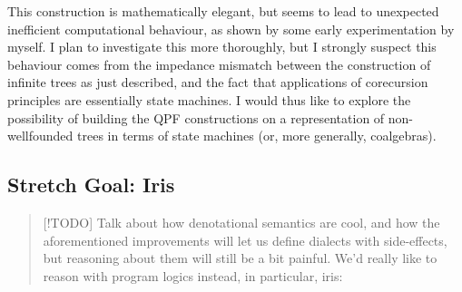 \documentclass[a4paper]{scrartcl}
\begin{document}
This construction is mathematically elegant, but seems to lead to
unexpected inefficient computational behaviour, as shown by some early
experimentation by myself. I plan to investigate this more thoroughly,
but I strongly suspect this behaviour comes from the impedance mismatch
between the construction of infinite trees as just described, and the
fact that applications of corecursion principles are essentially state
machines. I would thus like to explore the possibility of building the
QPF constructions on a representation of non-wellfounded trees in terms
of state machines (or, more generally, coalgebras).





\subsection{Stretch Goal: Iris}\label{stretch-goal-iris}

\begin{quote}
{[}!TODO{]} Talk about how denotational semantics are cool, and how the
aforementioned improvements will let us define dialects with
side-effects, but reasoning about them will still be a bit painful. We'd
really like to reason with program logics instead, in particular, iris:
\cite{jungIrisMonoidsInvariants2015}\cite{jungHigherorderGhostState2016}
\end{quote}


% 












\end{document}

